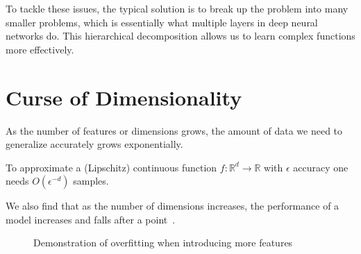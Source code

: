 \documentclass[11pt]{article}
\begin{document}
To tackle these issues, the typical solution is to break up the problem into many smaller problems, which is essentially what multiple layers in deep neural networks do. This hierarchical decomposition allows us to learn complex functions more effectively.

\section{Curse of Dimensionality}\label{sect:curse-of-dimensionality}

\begin{definition}\label{def:sample-explosion}
    As the number of features or dimensions grows, the amount of data we need to generalize accurately grows exponentially.

    To approximate a (Lipschitz) continuous function $f: \mathbb{R}^d \rightarrow \mathbb{R}$ with $\epsilon$ accuracy one needs $O(\epsilon^{-d})$ samples.
\end{definition}

We also find that as the number of dimensions increases, the performance of a model increases and falls after a point~\cite{visiondummyCurseDimensionality}.

\begin{figure}[H]
    \centering
    \caption{Demonstration of overfitting when introducing more features~\cite{visiondummyCurseDimensionality}}\label{fig:more-features-overfitting}
\end{figure}
\end{document}
